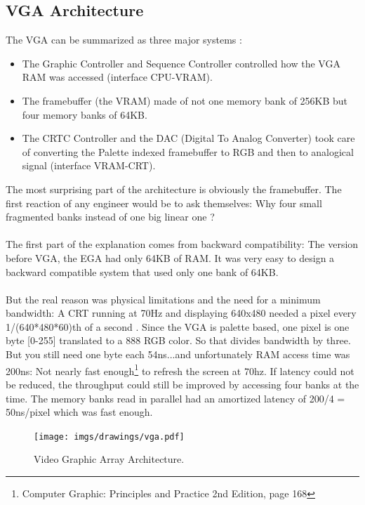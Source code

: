 \documentclass[book.tex]{subfiles}
\begin{document}
\subsection{VGA Architecture}

The VGA can be summarized as three major systems :

\begin{itemize}
\item The Graphic Controller and Sequence Controller controlled how the VGA RAM was accessed (interface CPU-VRAM).
\item The framebuffer (the VRAM) made of not one memory bank of 256KB but four memory banks of 64KB.
\item The CRTC Controller and the DAC (Digital To Analog Converter) took care of converting the Palette indexed framebuffer to RGB and then to analogical signal (interface VRAM-CRT).
\end{itemize}

The most surprising part of the architecture is obviously the framebuffer. The first reaction of any engineer would be to ask themselves: Why four small fragmented banks instead of one big linear one ?\\
\\
The first part of the explanation comes from backward compatibility: The version before VGA, the EGA had only 64KB of RAM. It was very easy to design a backward compatible system that used only one bank of 64KB.\\
\\
But the real reason was physical limitations and the need for a minimum bandwidth: A CRT running at 70Hz and displaying 640x480 needed a pixel every 1/(640*480*60)th of a second . Since the VGA is palette based, one pixel is one byte [0-255] translated to a 888 RGB color. So that divides bandwidth by three. But you still need one byte each 54ns...and unfortunately RAM access time was 200ns: Not nearly fast enough\footnote{Computer Graphic: Principles and Practice 2nd Edition, page 168} to refresh the screen at 70hz. If latency could not be reduced, the throughput could still be improved by accessing four banks at the time. The memory banks read in parallel had an amortized latency of 200/4 = 50ns/pixel which was fast enough.


\begin{figure}[H]
\centering
\texttt{[image: imgs/drawings/vga.pdf]}
\caption{Video Graphic Array Architecture.}
\label{fig:vga_arch}
\end{figure}
\end{document}

